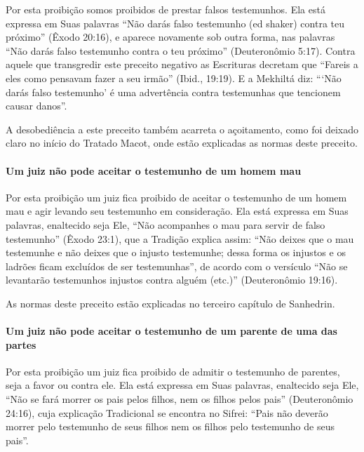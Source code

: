 Por esta proibição somos proibidos de prestar falsos testemunhos. Ela
está expressa em Suas palavras ``Não darás falso testemunho (ed shaker)
contra teu próximo'' (Êxodo 20:16), e aparece novamente sob outra
forma, nas palavras ``Não darás falso testemunho contra o teu próximo''
(Deuteronômio 5:17). Contra aquele que transgredir este preceito
negativo as Escrituras decretam que ``Fareis a eles como pensavam fazer
a seu irmão'' (Ibid., 19:19). E a Mekhiltá diz: ```Não darás falso
testemunho' é uma advertência contra testemunhas que tencionem causar
danos''.

A desobediência a este preceito também acarreta o açoitamento, como foi
deixado claro no início do Tratado Macot, onde estão explicadas as
normas deste preceito.

\paragraph{Um juiz não pode aceitar o testemunho de um homem mau}

Por esta proibição um juiz fica proibido de aceitar o testemunho de um
homem mau e agir levando seu testemunho em consideração. Ela está
expressa em Suas palavras, enaltecido seja Ele, ``Não acompanhes o mau
para servir de falso testemunho'' (Êxodo 23:1), que a Tradição explica
assim: ``Não deixes que o mau testemunhe e não deixes que o injusto
testemunhe; dessa forma os injustos e os ladrões ficam excluídos de ser
testemunhas'', de acordo com o versículo ``Não se levantarão testemunhos
injustos contra alguém (etc.)'' (Deuteronômio 19:16).

As normas deste preceito estão explicadas no terceiro capítulo de Sanhedrin.

\paragraph{Um juiz não pode aceitar o testemunho de um parente de uma das partes}

Por esta proibição um juiz fica proibido de admitir o testemunho de
parentes, seja a favor ou contra ele. Ela está expressa em Suas
palavras, enaltecido seja Ele, ``Não se fará morrer os pais pelos
filhos, nem os filhos pelos pais'' (Deuteronômio 24:16), cuja explicação
Tradicional se encontra no Sifrei: ``Pais não deverão morrer pelo
testemunho de seus filhos nem os filhos pelo testemunho de seus pais''.

